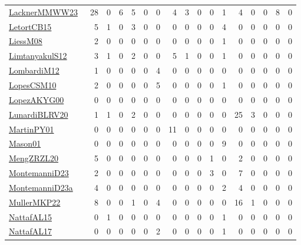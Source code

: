 {\begin{longtable}{l*{16}{r}}
\href{articles/LacknerMMWW23.pdf}{LacknerMMWW23}~\cite{LacknerMMWW23} & 28 & 0 & 6 & 5 & 0 & 0 & 4 & 3 & 0 & 0 & 1 & 4 & 0 & 0 & 8 & 0\\
\href{articles/LetortCB15.pdf}{LetortCB15}~\cite{LetortCB15} & 5 & 1 & 0 & 3 & 0 & 0 & 0 & 0 & 0 & 0 & 4 & 0 & 0 & 0 & 0 & 0\\
\href{articles/LiessM08.pdf}{LiessM08}~\cite{LiessM08} & 2 & 0 & 0 & 0 & 0 & 0 & 0 & 0 & 0 & 0 & 1 & 0 & 0 & 0 & 0 & 0\\
\href{articles/LimtanyakulS12.pdf}{LimtanyakulS12}~\cite{LimtanyakulS12} & 3 & 1 & 0 & 2 & 0 & 0 & 5 & 1 & 0 & 0 & 1 & 0 & 0 & 0 & 0 & 0\\
\href{articles/LombardiM12.pdf}{LombardiM12}~\cite{LombardiM12} & 1 & 0 & 0 & 0 & 0 & 4 & 0 & 0 & 0 & 0 & 0 & 0 & 0 & 0 & 0 & 0\\
\href{articles/LopesCSM10.pdf}{LopesCSM10}~\cite{LopesCSM10} & 2 & 0 & 0 & 0 & 0 & 5 & 0 & 0 & 0 & 0 & 1 & 0 & 0 & 0 & 0 & 0\\
\href{articles/LopezAKYG00.pdf}{LopezAKYG00}~\cite{LopezAKYG00} & 0 & 0 & 0 & 0 & 0 & 0 & 0 & 0 & 0 & 0 & 0 & 0 & 0 & 0 & 0 & 0\\
\href{articles/LunardiBLRV20.pdf}{LunardiBLRV20}~\cite{LunardiBLRV20} & 1 & 1 & 0 & 2 & 0 & 0 & 0 & 0 & 0 & 0 & 0 & 25 & 3 & 0 & 0 & 0\\
\href{articles/MartinPY01.pdf}{MartinPY01}~\cite{MartinPY01} & 0 & 0 & 0 & 0 & 0 & 0 & 11 & 0 & 0 & 0 & 0 & 0 & 0 & 0 & 0 & 0\\
\href{articles/Mason01.pdf}{Mason01}~\cite{Mason01} & 0 & 0 & 0 & 0 & 0 & 0 & 0 & 0 & 0 & 0 & 9 & 0 & 0 & 0 & 0 & 0\\
\href{articles/MengZRZL20.pdf}{MengZRZL20}~\cite{MengZRZL20} & 5 & 0 & 0 & 0 & 0 & 0 & 0 & 0 & 0 & 1 & 0 & 2 & 0 & 0 & 0 & 0\\
\href{articles/MontemanniD23.pdf}{MontemanniD23}~\cite{MontemanniD23} & 2 & 0 & 0 & 0 & 0 & 0 & 0 & 0 & 0 & 3 & 0 & 7 & 0 & 0 & 0 & 0\\
\href{articles/MontemanniD23a.pdf}{MontemanniD23a}~\cite{MontemanniD23a} & 4 & 0 & 0 & 0 & 0 & 0 & 0 & 0 & 0 & 0 & 2 & 4 & 0 & 0 & 0 & 0\\
\href{articles/MullerMKP22.pdf}{MullerMKP22}~\cite{MullerMKP22} & 8 & 0 & 0 & 1 & 0 & 4 & 0 & 0 & 0 & 0 & 0 & 16 & 1 & 0 & 0 & 0\\
\href{articles/NattafAL15.pdf}{NattafAL15}~\cite{NattafAL15} & 0 & 1 & 0 & 0 & 0 & 0 & 0 & 0 & 0 & 0 & 1 & 0 & 0 & 0 & 0 & 0\\
\href{articles/NattafAL17.pdf}{NattafAL17}~\cite{NattafAL17} & 0 & 0 & 0 & 0 & 0 & 2 & 0 & 0 & 0 & 0 & 1 & 0 & 0 & 0 & 0 & 0\\

\end{longtable}}
